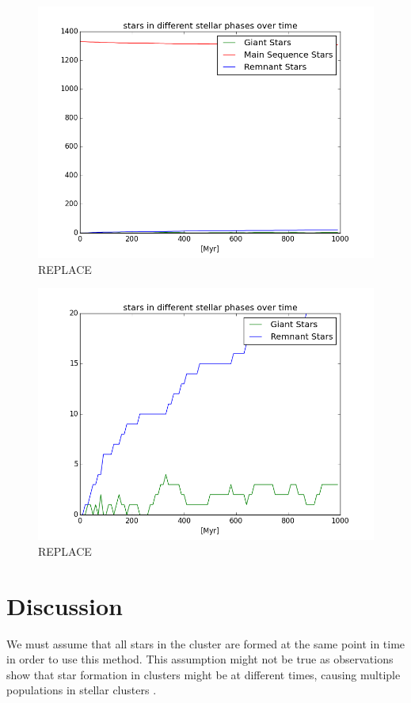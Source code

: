 \documentclass{aa}
\begin{document}
\begin{figure}
    \centering
    \includegraphics[width=\hsize]{img/stellar_phases_counts.png}
    \caption{REPLACE}\label{fig:phases}
\end{figure}

\begin{figure}
    \centering
    \includegraphics[width=\hsize]{img/stellar_phases_counts_without_main_sequence.png}
    \caption{REPLACE}\label{fig:phases_without_ms}
\end{figure}

\section{Discussion}\label{sec:discussion}
We must assume that all stars in the cluster are formed at the same point in time in order to use this method. This assumption might not be true as observations show that star formation in clusters might be at different times, causing multiple populations in stellar clusters \citep{2009IAUS..258..233P}.
\end{document}
